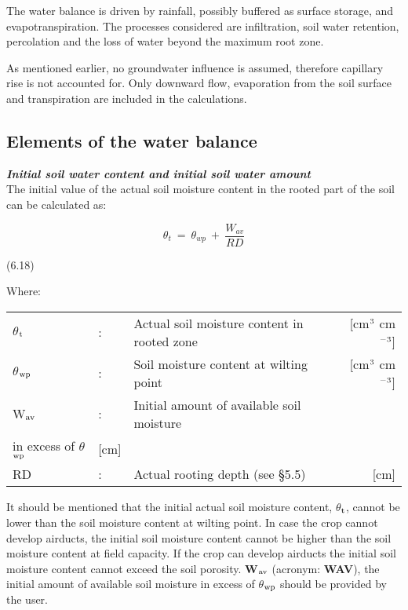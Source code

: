 The water balance is driven by rainfall, possibly buffered as surface storage, and
evapotranspi\-ration. The processes considered are infiltration, soil water retention,
percolation and the loss of water beyond the maximum root zone.

As mentioned earlier, no groundwater influence is assumed, therefore capillary rise is not
accounted for. Only downward flow, evaporation from the soil surface and transpiration
are included in the calcula\-tions. 

\newpage

\subsection{Elements of the water balance  }



{\it {\bf Initial soil water content and initial soil water amount}\/}\\
The initial value of the actual soil moisture content in the rooted part of the soil can be
calculated as:

\begin{equation}
\theta  _{t} ~ =~\theta  _{wp} ~+~{\frac{W _{av} }{RD}}
\end{equation}

 
\strut\hfill (6.18)

Where:\\
\begin{tabularx}{\textwidth}{llXr}



 $\theta$$_{{\rm t}}$ &:& Actual soil moisture content in rooted zone  & [cm$^{{\rm 3}}$ cm$^{{\rm -3}}$]\\
 $\theta$$_{{\rm wp}}$ &:& Soil moisture content at wilting point  & [cm$^{{\rm 3}}$ cm$^{{\rm -3}}$]\\
 W$_{{\rm av}}$ &:& Initial amount of available soil moisture\\
    in excess of $\theta$$_{{\rm wp}}$ & [cm]\\
 RD &:& Actual rooting depth (see \S 5.5) & [cm]
\end{tabularx}



It should be mentioned that the initial actual soil moisture content, $\theta$$_{{\rm t}}$, cannot be lower
than the soil moisture content at wilting point. In case the crop cannot develop airducts,
the initial soil moisture content cannot be higher than the soil moisture content at field
capacity. If the crop can develop airducts the initial soil moisture content cannot exceed
the soil porosity. {\bf W$_{{\rm av}}$} (acronym: {\bf WAV}), the initial amount of available soil moisture in
excess of $\theta$$_{{\rm wp}}$ should be provided by the user. 




